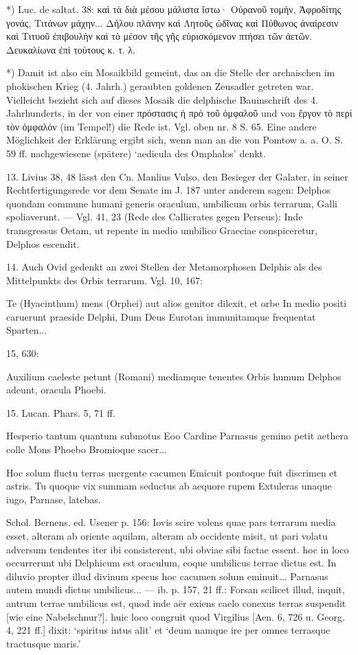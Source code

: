 \documentclass[a4paper, 11pt, oneside]{article}
\begin{document}
*) Luc. de saltat. 38: καὶ τὰ διὰ μέσου μάλιστα ἴστω· Οὐρανοῦ τομὴν, Ἀφροδίτης γονάς, Τιτάνων μάχην... Δήλου πλάνην καὶ Λητοῦς ὠδῖνας καὶ Πύθωνος ἀναίρεσιν καὶ Τιτυοῦ ἐπιβουλὴν καὶ τὸ μέσον τῆς γῆς εὑρισκόμενον πτήσει τῶν ἀετῶν. Δευκαλίωνα ἐπὶ τούτους κ. τ. λ.

*) Damit ist also ein Mosaikbild gemeint, das an die Stelle der archaischen im phokischen Krieg (4. Jahrh.) geraubten goldenen Zeusadler getreten war. Vielleicht bezieht sich auf dieses Mosaik die delphische Bauinschrift des 4. Jahrhunderts, in der von einer πρόστασις ἡ πρὸ τοῦ ὀμφαλοῦ und von ἔργον τὸ περὶ τὸν ὀμφαλόν (im Tempel!) die Rede ist. Vgl. oben nr. 8 S. 65. Eine andere Möglichkeit der Erklärung ergibt sich, wenn man an die von Pomtow a. a. O. S. 59 ff. nachgewiesene (spätere) `aedicula des Omphalos' denkt.

13. Livius 38, 48 lässt den Cn. Manlius Vulso, den Besieger der Galater, in seiner Rechtfertigungsrede vor dem Senate im J. 187 unter anderem sagen: Delphos quondam commune humani generis oraculum, umbilicum orbis terrarum, Galli spoliaverunt. --- Vgl. 41, 23 (Rede des Callicrates gegen Perseus): Inde transgressus Oetam, ut repente in medio umbilico Graeciae conspiceretur, Delphos escendit.

14. Auch Ovid gedenkt an zwei Stellen der Metamorphosen Delphis als des Mittelpunkts des Orbis terrarum. Vgl. 10, 167:

Te (Hyacinthum) mens (Orphei) aut alios genitor dilexit, et orbe  In medio positi caruerunt praeside Delphi,  Dum Deus Eurotan immunitamque frequentat  Sparten...

15, 630:

Auxilium caeleste petunt (Romani) mediamque tenentes  Orbis humum Delphos adeunt, oracula Phoebi.

15. Lucan. Phars. 5, 71 ff.

Hesperio tantum quantum submotus Eoo  Cardine Parnasus gemino petit aethera colle  Mons Phoebo Bromioque sacer...

Hoc solum fluctu terras mergente cacumen  Emicuit pontoque fuit discrimen et astris.  Tu quoque vix summam seductus ab aequore rupem  Extuleras unaque iugo, Parnase, latebas.

Schol. Bernens. ed. Usener p. 156: Iovis scire volens quae pars terrarum media esset, alteram ab oriente aquilam, alteram ab occidente misit, ut pari volatu adversum tendentes iter ibi consisterent, ubi obviae sibi factae essent. hoc in loco occurrerunt ubi Delphicum est oraculum, eoque umbilicus terrae dictus est. In diluvio propter illud divinum specus hoc cacumen solum eminuit... Parnasus autem mundi dictus umbilicus... --- ib. p. 157, 21 ff.: Forsan scilicet illud, inquit, antrum terrae umbilicus est, quod inde aër exiens caelo conexus terras suspendit [wie eine Nabelschnur?]. huic loco congruit quod Virgilius [Aen. 6, 726 u. Georg. 4, 221 ff.] dixit: `spiritus intus alit' et `deum namque ire per omnes terrasque tractusque maris.'
\end{document}
